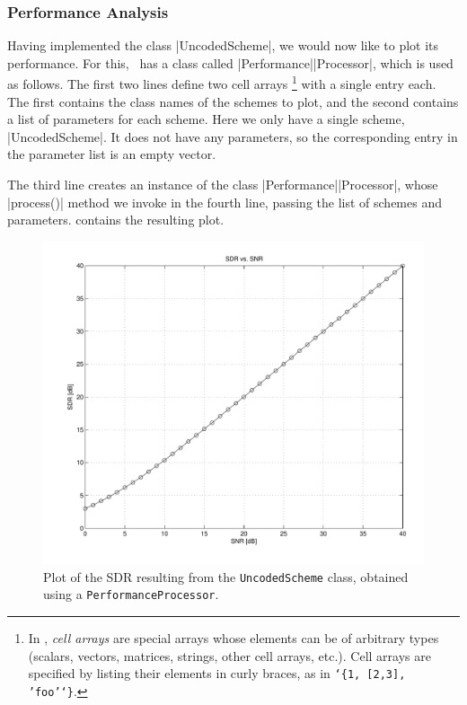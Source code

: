 \subsubsection{Performance Analysis}\label{sec:perfanalysis}

Having implemented the class |UncodedScheme|, we would now like to plot its
performance. For this, \jscsim\ has a class called |Performance|\-|Processor|,
which is used as follows.
The first two lines define two cell arrays%
\footnote{In \matlab, \emph{cell arrays} are special arrays whose elements can
be of arbitrary types (scalars, vectors, matrices, strings, other cell
arrays, etc.). Cell arrays are specified by listing their elements in curly
braces, as in \texttt{\char`\{1, [2,3], 'foo'\char`\}}.}
with a single entry each.
The first contains the class names of the schemes to plot, and
the second contains a list of parameters for each scheme. Here we only have a
single scheme, |UncodedScheme|. It does not have any parameters, so the
corresponding entry in the parameter list is an empty vector. 

The third line creates an instance of the class |Performance|\-|Processor|,
whose |process()| method we invoke in the fourth line, passing the list of
schemes and parameters.  contains the resulting plot.

\begin{figure}
  \begin{center}
    \includegraphics[width=\textwidth]{figures/matlab/ex_uncoded.pdf}
  \end{center}
  \caption{Plot of the SDR resulting from the \texttt{UncodedScheme} class,
  obtained using a \texttt{PerformanceProcessor}.}
  \label{fig:uncoded}
\end{figure}

